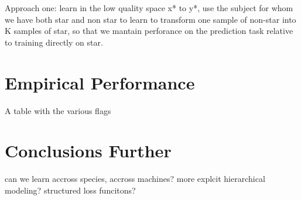 \documentclass[11pt, a4paper]{article}
\begin{document}
Approach one: learn in the low quality space x* to y*, use the subject for whom we have both star and non star to learn to transform one sample of non-star into K samples of star, so that we mantain perforance on the prediction task relative to training directly on star.


\section{Empirical Performance}

A table with the various flags

\section{Conclusions Further}

can we learn accross species, accross machines? more explcit hierarchical modeling? structured loss funcitons? 
\end{document}
